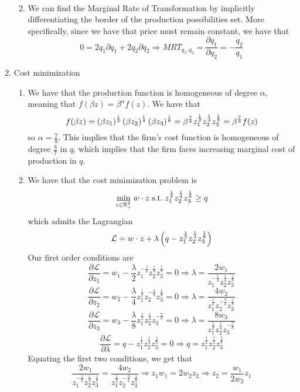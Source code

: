 \documentclass[12pt]{article}
\begin{document}
\begin{enumerate}
\begin{enumerate}
\begin{align*}
		\end{align*}
		\item We can find the Marginal Rate of Transformation by implicitly differentiating the border of the production possibilities set. More specifically, since we have that price must remain constant, we have that
		\[
		0 = 2q_1 \partial q_1 + 2q_2 \partial q_2 \Longrightarrow MRT_{q_1,q_2} = \frac{\partial q_1}{\partial q_2} = -\frac{q_2}{q_1}
		\]
	\end{enumerate}
	\item Cost minimization
	\begin{enumerate}
		\item We have that the production function is homogeneous of degree $\alpha$, meaning that $f(\beta z) = \beta^\alpha f(z)$. We have that
		\[
		f(\beta z) = \left( \beta z_1\right)^{\frac{1}{2}} \left( \beta z_2\right)^{\frac{1}{4}} \left( \beta z_3\right)^{\frac{1}{8}} = \beta^{\frac{7}{8}} z_1^{\frac{1}{2}} z_2^{\frac{1}{4}} z_3^{\frac{1}{8}} = \beta^{\frac{7}{8}} f(z)
		\]
		so $\alpha = \frac{7}{8}$. This implies that the firm's cost function is homogeneous of degree $\frac{8}{7}$ in $q$, which implies that the firm faces increasing marginal cost of production in $q$.
		\item We have that the cost minimization problem is
		\[
		\min_{z \in \mathbb{R}^3_+} w \cdot z \;\text{s.t.}\; z_1^{\frac{1}{2}} z_2^{\frac{1}{4}} z_3^{\frac{1}{8}} \ge q
		\]
		which admits the Lagrangian
		\[
		\mathcal{L} =  w \cdot z + \lambda \left( q - z_1^{\frac{1}{2}} z_2^{\frac{1}{4}} z_3^{\frac{1}{8}} \right)
		\]
		Our first order conditions are
		\[
		\frac{\partial \mathcal{L}}{\partial z_1} = w_1 - \frac{\lambda}{2} z_1^{-\frac{1}{2}} z_2^{\frac{1}{4}} z_3^{\frac{1}{8}} = 0 \Longrightarrow \lambda = \frac{2w_1 }{ z_1^{-\frac{1}{2}} z_2^{\frac{1}{4}} z_3^{\frac{1}{8}}}
		\]
		\[
		\frac{\partial \mathcal{L}}{\partial z_2} = w_2 - \frac{\lambda}{4} z_1^{\frac{1}{2}} z_2^{-\frac{3}{4}} z_3^{\frac{1}{8}} = 0 \Longrightarrow \lambda = \frac{4w_2 }{z_1^{\frac{1}{2}} z_2^{-\frac{3}{4}} z_3^{\frac{1}{8}}}
		\]
		\[
		\frac{\partial \mathcal{L}}{\partial z_3} = w_3 - \frac{\lambda}{8} z_1^{\frac{1}{2}} z_2^{\frac{1}{4}} z_3^{-\frac{7}{8}} = 0 \Longrightarrow \lambda = \frac{8w_3 }{z_1^{\frac{1}{2}} z_2^{\frac{1}{4}} z_3^{-\frac{7}{8}}}
		\]
		\[
		\frac{\partial \mathcal{L}}{\partial \lambda} =  q - z_1^{\frac{1}{2}} z_2^{\frac{1}{4}} z_3^{\frac{1}{8}} = 0 \Longrightarrow  q = z_1^{\frac{1}{2}} z_2^{\frac{1}{4}} z_3^{\frac{1}{8}}
		\]
		Equating the first two conditions, we get that
		\[
		\frac{2w_1 }{ z_1^{-\frac{1}{2}} z_2^{\frac{1}{4}} z_3^{\frac{1}{8}}} = \frac{4w_2 }{z_1^{\frac{1}{2}} z_2^{-\frac{3}{4}} z_3^{\frac{1}{8}}} \Longrightarrow z_1w_1 = 2w_2 z_2 \Longrightarrow z_2 = \frac{w_1}{2w_2}z_1
\]
\end{enumerate}
\end{enumerate}
\end{document}
